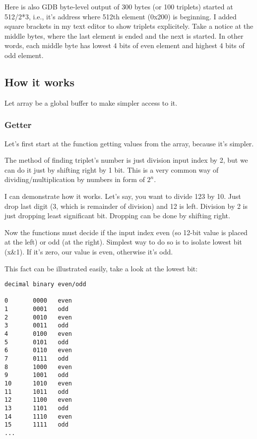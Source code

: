 Here is also GDB byte-level output of 300 bytes (or 100 triplets) started at 512/2*3, i.e., it's address where 512th element (0x200) is beginning.
I added square brackets in my text editor to show triplets explicitely.
Take a notice at the middle bytes, where the last element is ended and the next is started.
In other words, each middle byte has lowest 4 bits of even element and highest 4 bits of odd element.



\subsection{How it works}

Let array be a global buffer to make simpler access to it.

\subsubsection{Getter}

Let's first start at the function getting values from the array, because it's simpler.

The method of finding triplet's number is just division input index by 2, but we can do it just by shifting right by 1 bit.
This is a very common way of dividing/multiplication by numbers in form of $2^n$.

I can demonstrate how it works. Let's say, you want to divide 123 by 10.
Just drop last digit (3, which is remainder of division) and 12 is left.
Division by 2 is just dropping least significant bit. Dropping can be done by shifting right.

Now the functions must decide if the input index even (so 12-bit value is placed at the left) or odd (at the right).
Simplest way to do so is to isolate lowest bit (x\&1). If it's zero, our value is even, otherwise it's odd.

This fact can be illustrated easily, take a look at the lowest bit:

\begin{lstlisting}
decimal binary even/odd

0       0000   even
1       0001   odd
2       0010   even
3       0011   odd
4       0100   even
5       0101   odd
6       0110   even
7       0111   odd
8       1000   even
9       1001   odd
10      1010   even
11      1011   odd
12      1100   even
13      1101   odd
14      1110   even
15      1111   odd
...
\end{lstlisting}

